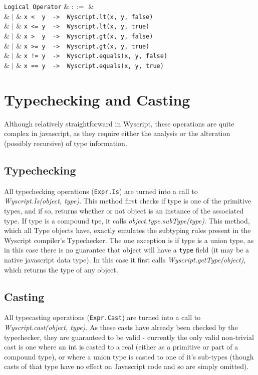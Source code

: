 \begin{syntax}
  \verb+Logical Operator+ & $::=$ & \\
  & $|$ & \verb+x <  y  ->  Wyscript.lt(x, y, false)+\\
  & $|$ & \verb+x <= y  ->  Wyscript.lt(x, y, true)+\\
  & $|$ & \verb+x >  y  ->  Wyscript.gt(x, y, false)+\\
  & $|$ & \verb+x >= y  ->  Wyscript.gt(x, y, true)+\\
  & $|$ & \verb+x != y  ->  Wyscript.equals(x, y, false)+\\
  & $|$ & \verb+x == y  ->  Wyscript.equals(x, y, true)+\\
\end{syntax}

\section{Typechecking and Casting}
\label{c_functions_typecasting}

Although relatively straightforward in Wyscript, these operations are quite complex in javascript, as they require either the analysis or the alteration (possibly recursive) of type information.

\subsection{Typechecking}
\label{c_functions_typechecking}

All typechecking operations (\lstinline{Expr.Is}) are turned into a call to {\em Wyscript.Is(object, type)}. This method first checks if type is one of the primitive types, and if so, returns whether or not object is an instance of the associated type. If type is a compound tpe, it calls {\em object.type.subType(type)}. This method, which all Type objects have, exactly emulates the subtyping rules present in the Wyscript compiler's Typechecker. The one exception is if type is a union type, as in this case there is no guarantee that object will have a \lstinline{type} field (it may be a native javascript data type). In this case it first calls {\em Wyscript.getType(object)}, which returns the type of any object.

\subsection{Casting}
\label{c_functions_casting}

All typecasting operations (\lstinline{Expr.Cast}) are turned into a call to {\em Wyscript.cast(object, type)}. As these casts have already been checked by the typechecker, they are guaranteed to be valid - currently the only valid non-trivial cast is one where an int is casted to a real (either as a primitive or part of a compound type), or where a union type is casted to one of it's sub-types (though casts of that type have no effect on Javascript code and so are simply omitted).\\

